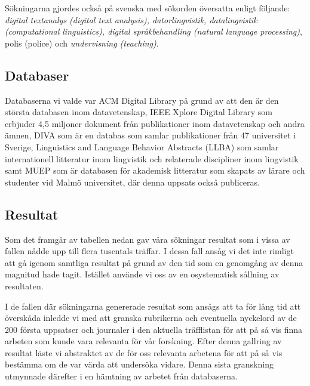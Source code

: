 \documentclass[swedish]{maucsthesis}
\begin{document}
Sökningarna gjordes också på svenska med sökorden översatta enligt följande: \textit
{digital textanalys (digital text analysis), datorlingvistik, datalingvistik
(computational linguistics), digital språkbehandling (natural language processing)}, {polis (police)} och
\textit {undervisning (teaching)}.

\subsection{Databaser}
Databaserna vi valde var ACM Digital Library på grund av att den är den
största databasen inom datavetenskap, IEEE Xplore Digital Library som erbjuder
4,5 miljoner dokument från publikationer inom datavetenskap och andra ämnen,
DIVA som är en databas som samlar publikationer från 47 universitet i Sverige,
Linguistics and Language Behavior Abstracts (LLBA) som samlar internationell
litteratur inom lingvistik och relaterade discipliner inom lingvistik samt
MUEP som är databasen för akademisk litteratur som skapats av lärare och
studenter vid Malmö universitet, där denna uppsats också publiceras. 

\subsection{Resultat}
Som det framgår av tabellen nedan gav våra sökningar resultat som i vissa av fallen nådde upp till flera tusentals träffar. I dessa fall ansåg vi det inte rimligt att gå igenom samtliga resultat på grund av den tid som en genomgång av denna magnitud hade tagit. Istället använde vi oss av en osystematisk sållning av resultaten.

I de fallen där sökningarna genererade resultat som ansågs att ta för lång tid att överskåda inledde vi med att granska rubrikerna och eventuella nyckelord av de 200 första uppsatser och journaler i den aktuella träfflistan för att på så vis finna arbeten som kunde vara relevanta för vår forskning. Efter denna gallring av resultat läste vi abstraktet av de för oss relevanta arbetena för att på så vis bestämma om de var värda att undersöka vidare. Denna sista granskning utmynnade därefter i en hämtning av arbetet från databaserna.
\end{document}
